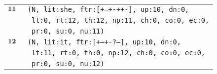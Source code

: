 \documentclass{article}
\begin{document}
\begin{minipage}{\textwidth}
{\begin{tabular}{|r|l|}
    ${\textbf{\textrm{11}}_{\phantom{z}}}$ & \texttt{\texttt{(N,~lit:she,~ftr:[+--+-++-],~up:10,~dn:0,}} \\
    & \texttt{\texttt{~lt:0,~rt:12,~th:12,~np:11,~ch:0,~co:0,~ec:0,}} \\
    & \texttt{\texttt{~pr:0,~su:0,~nu:11)}} \\
    ${\textbf{\textrm{12}}_{\phantom{z}}}$ & \texttt{\texttt{(N,~lit:it,~ftr:[+--+-?--],~up:10,~dn:0,}} \\
    & \texttt{\texttt{~lt:11,~rt:0,~th:0,~np:12,~ch:0,~co:0,~ec:0,}} \\
    & \texttt{\texttt{~pr:0,~su:0,~nu:12)}} \\
    \hline
  \end{tabular}
  }
\end{minipage}
\bigbreak

\bigbreak
\vbox{}
\bigbreak
\end{document}
